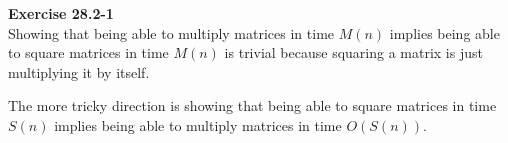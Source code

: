 \documentclass{article}
\begin{document}
\noindent\textbf{Exercise 28.2-1}\\
Showing that being able to multiply matrices in time $M(n)$ implies being able to square matrices in time $M(n)$ is trivial because squaring a matrix is just multiplying it by itself.

The more tricky direction is showing that being able to square matrices in time $S(n)$ implies being able to multiply matrices in time $O(S(n))$. \begin{comment}
This can be done with a trick smelling faintly of Karatsuba's algorithm (see problem 30-1). Suppose that we wanted to multiply matrices A and B. Then, we have that
\[
(A+B)^2 = A^2 + AB +BA + B^2
\]
So,
\[
AB+BA = (A+B)^2 -A^2 -B^2
\]
and so, can be computed in time $3S(n)$. So, in time $O(S(n))$ we can compute $AB$ given $BA$. Now, we consider dividing up the matrix into four equal parts, each of which are $n/2 \times n/2$ matrices.
\[
A = \left(\begin{array}{cc} A_{11}&A_{12}\\A_{21}&A_{22}\end{array}\right)
\]
and
\[
B = \left(\begin{array}{cc} B_{11}&B_{12}\\B_{21}&B_{22}\end{array}\right)
\]
Then, our end goal will be to compute the four following expressions
\begin{align*}
A_{11}B_{11} + A_{12}B_{21}\\
A_{11}B_{12} + A_{12}B_{22}\\
A_{21}B_{11} + A_{22}B_{21}\\
A_{21}B_{12} + A_{22}B_{22}\\
\end{align*}
Then, since we can compute $AB + BA$, we can look at the four entries of that to know that we can compute The following four expressions
\begin{align*}
A_{11}B_{11} + A_{12}B_{21} + B_{11}A_{11} + B_{12}A_{21}\\
A_{11}B_{12} + A_{12}B_{22} + B_{11}A_{12} + B_{12}A_{22}\\
A_{21}B_{11} + A_{22}B_{21} + B_{21}A_{11} + B_{22}A_{21}\\
A_{21}B_{12} + A_{22}B_{22} + B_{21}A_{12} + B_{22}A_{22}\\
\end{align*}
However, since we can compute the sum of each of these products summed with the multiplication in the other order. That is, we replace $B_{ij}A_{pq}$ with $A_{pq}B_{ij} +A_{pq}^2 + B_{ij}^2 -(A_{pq} + B_{ij})^2$. Since the last three terms are things we can compute with our squaring algorithm, we know the values of the following expressions:
\begin{align*}
A_{11}B_{11} + A_{12}B_{21} + A_{11}B_{11} + A_{21}B_{12}\\
A_{11}B_{12} + A_{12}B_{22} + A_{12}B_{11} + A_{22}B_{12}\\
A_{21}B_{11} + A_{22}B_{21} + A_{11}B_{21} + A_{21}B_{22}\\
A_{21}B_{12} + A_{22}B_{22} + A_{12}B_{21} + A_{22}B_{22}\\
\end{align*}
\end{comment}
\end{document}
